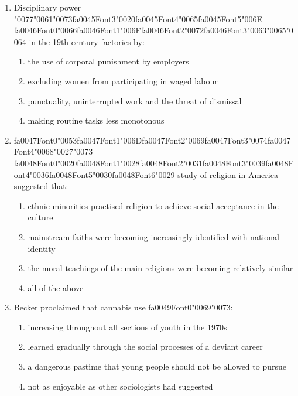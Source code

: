 \documentclass[12pt]{article}
\begin{document}
\begin{enumerate}[label=\arabic*.]
\begin{enumerate}[label=(\alph*)]
    \item reject both the goals and means of conventional society and provide utopian alternatives
\end{enumerate}
\item Disciplinary power {\char"0077}{\char"0061}{\char"0073}{\csname fa0045Font3\endcsname\char"0020}{\csname fa0045Font4\endcsname\char"0065}{\csname fa0045Font5\endcsname\char"006E} {\csname fa0046Font0\endcsname\char"0066}{\csname fa0046Font1\endcsname\char"006F}{\csname fa0046Font2\endcsname\char"0072}{\csname fa0046Font3\endcsname\char"0063}{\char"0065}{\char"0064} in the 19th century factories by:
\begin{enumerate}[label=(\alph*)]
    \item the use of corporal punishment by employers
    \item excluding women from participating in waged labour
    \item punctuality, uninterrupted work and the threat of dismissal
    \item making routine tasks less monotonous
\end{enumerate}
\item {\csname fa0047Font0\endcsname\char"0053}{\csname fa0047Font1\endcsname\char"006D}{\csname fa0047Font2\endcsname\char"0069}{\csname fa0047Font3\endcsname\char"0074}{\csname fa0047Font4\endcsname\char"0068}{\char"0027}{\char"0073} {\csname fa0048Font0\endcsname\char"0020}{\csname fa0048Font1\endcsname\char"0028}{\csname fa0048Font2\endcsname\char"0031}{\csname fa0048Font3\endcsname\char"0039}{\csname fa0048Font4\endcsname\char"0036}{\csname fa0048Font5\endcsname\char"0030}{\csname fa0048Font6\endcsname\char"0029} study of religion in America suggested that:
\begin{enumerate}[label=(\alph*)]
    \item ethnic minorities practised religion to achieve social acceptance in the culture
    \item mainstream faiths were becoming increasingly identified with national identity
    \item the moral teachings of the main religions were becoming relatively similar
    \item all of the above
\end{enumerate}
\item Becker proclaimed that cannabis use {\csname fa0049Font0\endcsname\char"0069}{\char"0073}:
\begin{enumerate}[label=(\alph*)]
    \item increasing throughout all sections of youth in the 1970s
    \item learned gradually through the social processes of a deviant career
    \item a dangerous pastime that young people should not be allowed to pursue
    \item not as enjoyable as other sociologists had suggested
\end{enumerate}
\end{enumerate}
\end{document}
